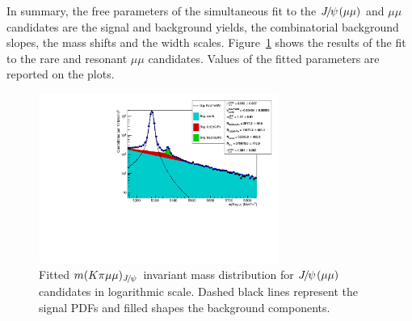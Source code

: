 In summary, the free parameters of the simultaneous fit to the $\jpsi(\mu\mu)$ and $\mu\mu$ candidates are the signal and background yields, the combinatorial background slopes, the mass shifts and the width scales.
Figure~\ref{fig:mumu_data_fits} shows the results of the fit to the rare and resonant
$\mu\mu$ candidates. Values of the fitted parameters are reported on the plots.
%
\begin{figure}[bh!]
\centering
\includegraphics[width=0.7\textwidth]{RKst/figs/Fit/fit_MM/KstJPsMM_log.pdf}
\caption{Fitted $m(K\pi \mu\mu)_\jpsi$ invariant mass distribution for $\jpsi(\mu\mu)$ candidates
in logarithmic scale. Dashed black lines represent the signal PDFs and filled shapes the background components. }
\label{fig:mumu_data_fits}
\end{figure}
%
